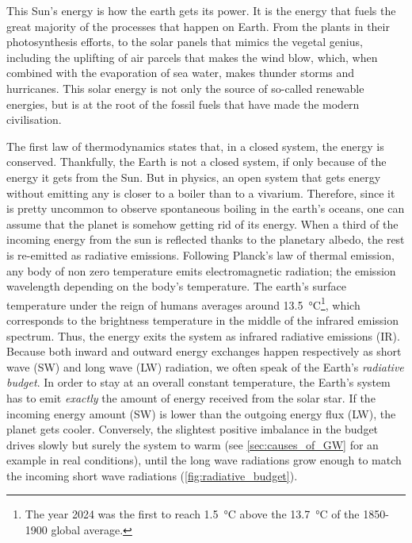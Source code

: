 This Sun's energy is how the earth gets its power. It is the energy that fuels the great majority of the processes that happen on Earth. From the plants in their photosynthesis efforts, to the solar panels that mimics the vegetal genius, including the uplifting of air parcels that makes the wind blow, which, when combined with the evaporation of sea water, makes thunder storms and hurricanes. 
This solar energy is not only the source of so-called renewable energies, but is at the root of the fossil fuels that have made the modern civilisation. 
\vspace{\baselineskip}

The first law of thermodynamics states that, in a closed system, the energy is conserved. Thankfully, the Earth is not a closed system, if only because of the energy it gets from the Sun. But in physics, an open system that gets energy without emitting any is closer to a boiler than to a vivarium. Therefore, since it is pretty uncommon to observe spontaneous boiling in the earth's oceans, one can assume that the planet is somehow getting rid of its energy.
When a third of the incoming energy from the sun is reflected thanks to the planetary albedo, the rest is re-emitted as radiative emissions. Following Planck's law of thermal emission, any body of non zero temperature emits electromagnetic radiation; the emission wavelength depending on the body's temperature.
The earth's surface temperature under the reign of humans averages around \SI{13.5}{\degreeCelsius}\footnote{The year 2024 was the first to reach \SI{1.5}{\degreeCelsius} above the \SI{13.7}{\degreeCelsius} of the 1850-1900 global average.}, which corresponds to the brightness temperature in the middle of the infrared emission spectrum. Thus, the energy exits the system as infrared radiative emissions (IR).
Because both inward and outward energy exchanges happen respectively as short wave (SW) and long wave (LW) radiation, we often speak of the Earth's \textit{radiative budget}.
In order to stay at an overall constant temperature, the Earth's system has to emit \textit{exactly} the amount of energy received from the solar star. If the incoming energy amount (SW) is lower than the outgoing energy flux (LW), the planet gets cooler. Conversely, the slightest positive imbalance in the budget drives slowly but surely the system to warm (see \cref{sec:causes_of_GW} for an example in real conditions), until the long wave radiations grow enough to match the incoming short wave radiations (\cref{fig:radiative_budget}).
\vspace{\baselineskip}

